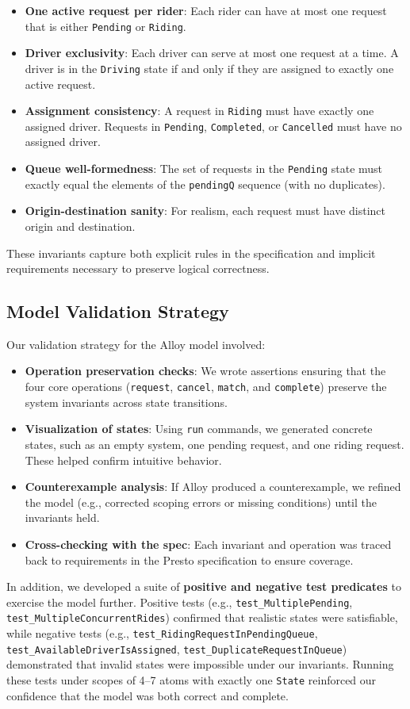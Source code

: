 \documentclass[11pt]{article}
\begin{document}
\begin{itemize}[leftmargin=1.5em]
  \item \textbf{One active request per rider}: Each rider can have at most one request that is either \texttt{Pending} or \texttt{Riding}.
  \item \textbf{Driver exclusivity}: Each driver can serve at most one request at a time. A driver is in the \texttt{Driving} state if and only if they are assigned to exactly one active request.
  \item \textbf{Assignment consistency}: A request in \texttt{Riding} must have exactly one assigned driver. Requests in \texttt{Pending}, \texttt{Completed}, or \texttt{Cancelled} must have no assigned driver.
  \item \textbf{Queue well-formedness}: The set of requests in the \texttt{Pending} state must exactly equal the elements of the \texttt{pendingQ} sequence (with no duplicates).
  \item \textbf{Origin-destination sanity}: For realism, each request must have distinct origin and destination.
\end{itemize}
These invariants capture both explicit rules in the specification and implicit requirements necessary to preserve logical correctness.

\subsection{Model Validation Strategy}

Our validation strategy for the Alloy model involved:
\begin{itemize}[leftmargin=1.5em]
  \item \textbf{Operation preservation checks}: We wrote assertions ensuring that the four core operations (\texttt{request}, \texttt{cancel}, \texttt{match}, and \texttt{complete}) preserve the system invariants across state transitions.
  \item \textbf{Visualization of states}: Using \texttt{run} commands, we generated concrete states, such as an empty system, one pending request, and one riding request. These helped confirm intuitive behavior.
  \item \textbf{Counterexample analysis}: If Alloy produced a counterexample, we refined the model (e.g., corrected scoping errors or missing conditions) until the invariants held.
  \item \textbf{Cross-checking with the spec}: Each invariant and operation was traced back to requirements in the Presto specification to ensure coverage.
\end{itemize}
In addition, we developed a suite of \textbf{positive and negative test predicates} 
to exercise the model further. Positive tests (e.g., \texttt{test\_MultiplePending}, 
\texttt{test\_MultipleConcurrentRides}) confirmed that realistic states were satisfiable, 
while negative tests (e.g., \texttt{test\_RidingRequestInPendingQueue}, 
\texttt{test\_AvailableDriverIsAssigned}, \texttt{test\_DuplicateRequestInQueue}) 
demonstrated that invalid states were impossible under our invariants. 
Running these tests under scopes of 4–7 atoms with exactly one \texttt{State} 
reinforced our confidence that the model was both correct and complete.
\end{document}
